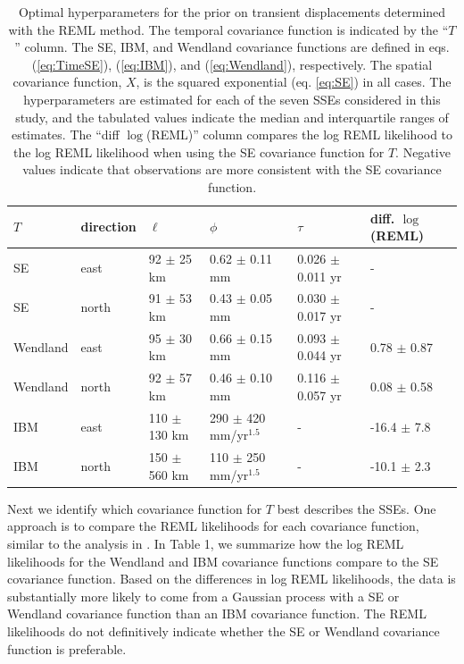 \documentclass[extra,mreferee]{gji}
\begin{document}
\begin{table}\label{tab:Parameters}
\caption{Optimal hyperparameters for the prior on transient displacements determined with the REML method. The temporal covariance function is indicated by the ``$T$'' column. The SE, IBM, and Wendland covariance functions are defined in eqs. (\ref{eq:TimeSE}), (\ref{eq:IBM}), and (\ref{eq:Wendland}), respectively. The spatial covariance function, $X$, is the squared exponential (eq. \ref{eq:SE}) in all cases. The hyperparameters are estimated for each of the seven SSEs considered in this study, and the tabulated values indicate the median and interquartile ranges of estimates. The ``diff $\log$(REML)'' column compares the log REML likelihood to the log REML likelihood when using the SE covariance function for $T$. Negative values indicate that observations are more consistent with the SE covariance function.} 
\begin{tabular} {l l l l l l}
$T$ & direction & $\ell$  & $\phi$   & $\tau$  & diff. $\log$(REML) \\ \hline
SE & east   & 92 $\pm$ 25 km  & 0.62 $\pm$ 0.11 mm  & 0.026 $\pm$ 0.011 yr  &  - \\
SE & north  & 91 $\pm$ 53 km  & 0.43 $\pm$ 0.05 mm  & 0.030 $\pm$ 0.017 yr  &  - \\
Wendland & east   & 95 $\pm$ 30 km  & 0.66 $\pm$ 0.15 mm  & 0.093 $\pm$ 0.044 yr &  0.78 $\pm$ 0.87 \\
Wendland & north  & 92 $\pm$ 57 km  & 0.46 $\pm$ 0.10 mm  & 0.116 $\pm$ 0.057 yr &  0.08 $\pm$ 0.58 \\
IBM & east   & 110 $\pm$ 130 km & 290 $\pm$ 420 mm/yr$^{1.5}$  & -          & -16.4 $\pm$ 7.8 \\
IBM & north  & 150 $\pm$ 560 km & 110 $\pm$ 250 mm/yr$^{1.5}$ & -           & -10.1 $\pm$ 2.3 \\
\end{tabular}
\end{table}

Next we identify which covariance function for $T$ best describes the SSEs. One approach is to compare the REML likelihoods for each covariance function, similar to the analysis in \citet{Langbein2004}. In Table 1, we summarize how the log REML likelihoods for the Wendland and IBM covariance functions compare to the SE covariance function.  Based on the differences in log REML likelihoods, the data is substantially more likely to come from a Gaussian process with a SE or Wendland covariance function than an IBM covariance function. The REML likelihoods do not definitively indicate whether the SE or Wendland covariance function is preferable. 
\end{document}
